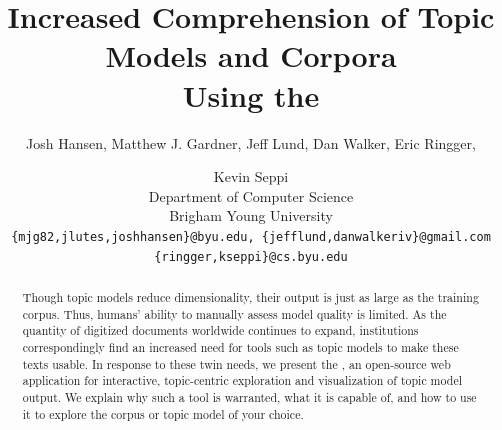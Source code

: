 \documentclass[11pt]{article}
\title{Increased Comprehension of Topic Models and Corpora\\ Using the \tool}
\author{Josh Hansen, Matthew J. Gardner, Jeff Lund, Dan Walker, Eric Ringger, \and Kevin Seppi\\
Department of Computer Science\\
Brigham Young University\\
\tt \{mjg82,jlutes,joshhansen\}@byu.edu, \{jefflund,danwalkeriv\}@gmail.com\\
\tt \{ringger,kseppi\}@cs.byu.edu}
\begin{document}
\maketitle

\begin{abstract}
Though topic models reduce dimensionality, their output is just as large as the
training corpus. Thus, humans' ability to manually assess model quality is
limited. As the quantity of digitized documents worldwide continues to expand,
institutions correspondingly find an increased need for tools such as topic
models to make these texts usable. In response to these twin needs, we present
the \tool, an open-source web application for interactive,
topic-centric exploration and visualization of topic model output. We explain
why such a tool is warranted, what it is capable of, and how to use it to
explore the corpus or topic model of your choice.
\end{abstract}
\end{document}
